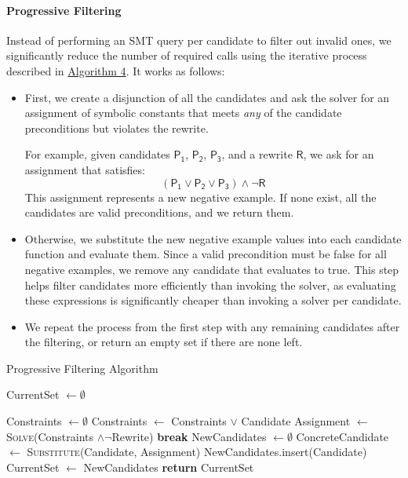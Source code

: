 \documentclass[review, anonymous, acmsmall]{acmart}
\newcommand{\blockmath}[1]{\[\mathsf{#1}\]}
\newcommand{\inline}[1]{$\mathsf{#1}$}
\begin{document}
\paragraph{Progressive Filtering}
Instead of performing an SMT query per candidate to filter out invalid ones, we significantly reduce the number of required calls using the iterative process described in \hyperref[alg:progressive]{Algorithm 4}. It works as follows:
\begin{itemize}
    \item First, we create a disjunction of all the candidates and ask the solver for an assignment of symbolic constants that meets \textit{any} of the candidate preconditions but violates the rewrite. 
    
    For example, given candidates \inline{P_1}, \inline{P_2}, \inline{P_3}, and a rewrite \inline{R}, we ask for an assignment that satisfies:
    \blockmath{(P_1 \lor P_2 \lor P_3) \land \neg R}
    This assignment represents a new negative example. If none exist, all the candidates are valid preconditions, and we return them.  
    \item Otherwise, we substitute the new negative example values into each candidate function and evaluate them. Since a valid precondition must be false for all negative examples, we remove any candidate that evaluates to true. This step helps filter candidates more efficiently than invoking the solver, as evaluating these expressions is significantly cheaper than invoking a solver per candidate. 
    \item We repeat the process from the first step with any remaining candidates after the filtering, or return an empty set if there are none left.  
\end{itemize}


\begin{algorithm}[tbh]
\caption{Progressive Filtering Algorithm}\label{alg:progressive}
\begin{algorithmic}[1]
\State CurrentSet $\gets \emptyset$

\State Constraints $\gets \emptyset$ 
\State Constraints  $\gets $ Constraints $\lor$ Candidate
\EndFor
\State Assignment $\gets$ \textsc{Solve}(Constraints $ \land \neg$Rewrite)
\State \textbf{break}
\EndIf
\State NewCandidates $\gets \emptyset$
  
\State ConcreteCandidate $\gets$ \textsc{Substitute}(Candidate, Assignment)
\State NewCandidates.insert(Candidate) 
\EndIf
\EndFor
\State CurrentSet $\gets $ NewCandidates
\EndWhile
\State \textbf{return} CurrentSet
\EndProcedure
\end{algorithmic}
\end{algorithm}
\end{document}
